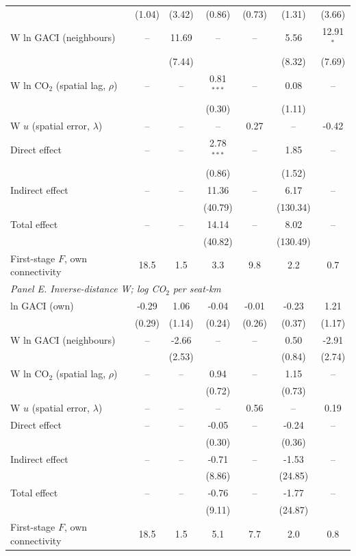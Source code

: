 \documentclass[12pt]{article}
\begin{document}
\begin{table}[H]
{\begin{threeparttable}
\begin{tabular}{lcccccc}
   & (1.04) & (3.42) & (0.86) & (0.73) & (1.31) & (3.66) \\
  W ln GACI (neighbours) & -- & 11.69 & -- & -- & 5.56 & 12.91$^{*}$ \\
   &  & (7.44) &  &  & (8.32) & (7.69) \\
  W ln CO$_2$ (spatial lag, $\rho$) & -- & -- & 0.81$^{***}$ & -- & 0.08 & -- \\
   &  &  & (0.30) &  & (1.11) &  \\
  W $u$ (spatial error, $\lambda$) & -- & -- & -- & 0.27 & -- & -0.42 \\
  Direct effect & -- & -- & 2.78$^{***}$ & -- & 1.85 & -- \\
   &  &  & (0.86) &  & (1.52) &  \\
  Indirect effect & -- & -- & 11.36 & -- & 6.17 & -- \\
   &  &  & (40.79) &  & (130.34) &  \\
  Total effect & -- & -- & 14.14 & -- & 8.02 & -- \\
   &  &  & (40.82) &  & (130.49) &  \\
  First-stage $F$, own connectivity & 18.5 & 1.5 & 3.3 & 9.8 & 2.2 & 0.7 \\
\midrule
\multicolumn{7}{l}{\textit{Panel E. Inverse-distance W; log CO$_2$ per seat-km}} \\
  ln GACI (own) & -0.29 & 1.06 & -0.04 & -0.01 & -0.23 & 1.21 \\
   & (0.29) & (1.14) & (0.24) & (0.26) & (0.37) & (1.17) \\
  W ln GACI (neighbours) & -- & -2.66 & -- & -- & 0.50 & -2.91 \\
   &  & (2.53) &  &  & (0.84) & (2.74) \\
  W ln CO$_2$ (spatial lag, $\rho$) & -- & -- & 0.94 & -- & 1.15 & -- \\
   &  &  & (0.72) &  & (0.73) &  \\
  W $u$ (spatial error, $\lambda$) & -- & -- & -- & 0.56 & -- & 0.19 \\
  Direct effect & -- & -- & -0.05 & -- & -0.24 & -- \\
   &  &  & (0.30) &  & (0.36) &  \\
  Indirect effect & -- & -- & -0.71 & -- & -1.53 & -- \\
   &  &  & (8.86) &  & (24.85) &  \\
  Total effect & -- & -- & -0.76 & -- & -1.77 & -- \\
   &  &  & (9.11) &  & (24.87) &  \\
  First-stage $F$, own connectivity & 18.5 & 1.5 & 5.1 & 7.7 & 2.0 & 0.8 \\

\end{tabular}
\end{threeparttable}}
\end{table}
\end{document}
